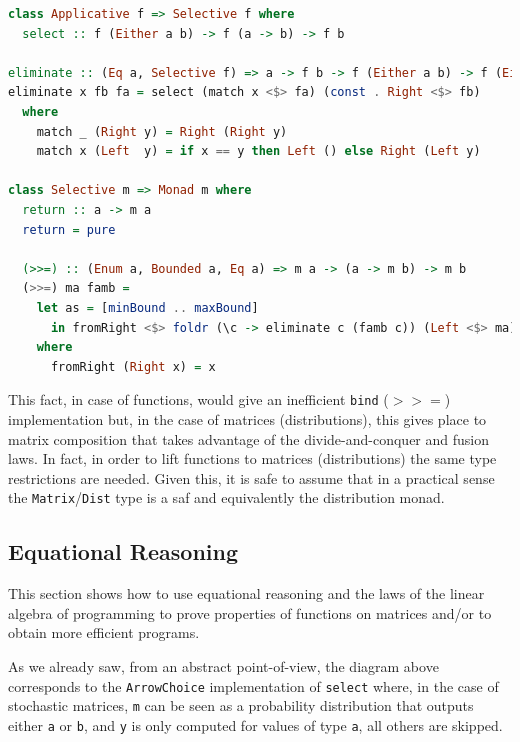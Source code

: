 \documentclass[
  oneside,
  11pt, a4paper,
  footinclude=true,
  headinclude=true,
  cleardoublepage=empty
]{scrbook}
\theoremstyle{definition}
\theoremstyle{definition}
\begin{document}
        \begin{lstlisting}[language=Haskell, caption={Constrainted monad instance},captionpos=b]
class Applicative f => Selective f where
  select :: f (Either a b) -> f (a -> b) -> f b

eliminate :: (Eq a, Selective f) => a -> f b -> f (Either a b) -> f (Either a b)
eliminate x fb fa = select (match x <$> fa) (const . Right <$> fb)
  where
    match _ (Right y) = Right (Right y)
    match x (Left  y) = if x == y then Left () else Right (Left y)

class Selective m => Monad m where
  return :: a -> m a
  return = pure

  (>>=) :: (Enum a, Bounded a, Eq a) => m a -> (a -> m b) -> m b
  (>>=) ma famb =
    let as = [minBound .. maxBound]
      in fromRight <$> foldr (\c -> eliminate c (famb c)) (Left <$> ma) as
    where
      fromRight (Right x) = x
        \end{lstlisting}{}
        
        This fact, in case of functions, would give an inefficient \texttt{bind} ($>>=$) implementation but, in the case of matrices (distributions), this gives place to matrix composition that takes advantage of the divide-and-conquer and fusion laws. In fact, in order to lift functions to matrices (distributions) the same type restrictions are needed. Given this, it is safe to assume that in a practical sense the \texttt{Matrix}/\texttt{Dist} type is a \gls{saf} and equivalently the distribution monad.
        
        \subsection{Equational Reasoning}\label{sec-eq-reason}
        
        This section shows how to use equational reasoning and the laws of the linear algebra of programming to prove properties of functions on matrices and/or to obtain more efficient programs.
        
        \begin{figure}[h]%
        \centering
        \end{figure}
        As we already saw, from an abstract point-of-view, the diagram above corresponds to the \texttt{ArrowChoice} implementation of \texttt{select} where, in the case of stochastic matrices, \texttt{m} can be seen as a probability distribution that outputs either \texttt{a} or \texttt{b}, and \texttt{y} is only computed for values of type \texttt{a}, all others are skipped.
        
\end{document}
